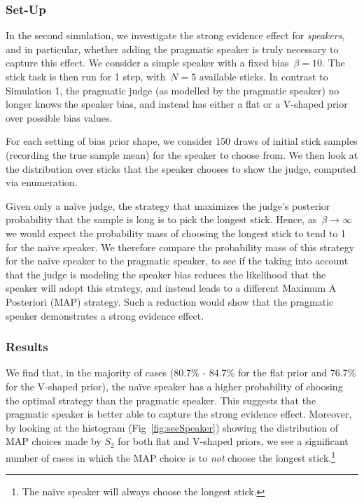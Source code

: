 \documentclass[10pt,letterpaper]{article}
\begin{document}
\subsubsection{Set-Up}
In the second simulation, we investigate the strong evidence effect for \textit{speakers}, and in particular, whether adding the 
pragmatic speaker is truly necessary to capture this effect. We consider a simple speaker with a fixed bias~${\beta=10}$.
The stick task is then run for 1 step, with~${N=5}$ available sticks. In contrast to Simulation 1, the pragmatic judge 
(as modelled by the pragmatic speaker) no longer knows the speaker bias, and instead has either a flat or a V-shaped prior over possible bias values.

For each setting of bias prior shape, we consider 150 draws of initial stick samples (recording the true sample mean)
for the speaker to choose from. We then look at the distribution over sticks that the speaker chooses to show the judge, computed via enumeration.

Given only a na\"ive judge, the strategy that maximizes the judge's posterior probability that the sample is long is to pick the longest stick. Hence, as~${\beta\to\infty}$ 
we would expect the probability mass of choosing the longest stick to tend to 1 for the na\"ive speaker. We therefore compare the probability mass of this 
strategy for the na\"ive speaker to the pragmatic speaker, to see if the taking into account that the judge is modeling the speaker bias reduces the 
likelihood that the speaker will adopt this strategy, and instead leads to a different Maximum A Posteriori (MAP) strategy. Such
a reduction would show that the pragmatic speaker demonstrates a strong evidence effect.

\subsubsection{Results}

We find that, in the majority of cases (80.7\% - 84.7\% for the flat prior and 76.7\% for the V-shaped prior), the na\"ive speaker has a higher probability of choosing the optimal 
strategy than the pragmatic speaker. This suggests that the pragmatic speaker is better able to capture the strong evidence effect.
Moreover, by looking at the histogram (Fig~\ref{fig:seeSpeaker}) showing the distribution of MAP choices made by $S_2$ for both flat and V-shaped priors,
we see a significant number of cases in which the MAP choice is to \textit{not} choose the longest stick.\footnote{The na\"ive speaker
will always choose the longest stick.} 
\end{document}
